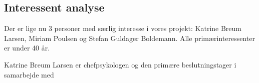 \subsection{Interessent analyse}

Der er lige nu 3 personer med særlig interesse i vores projekt: Katrine Breum Larsen, Miriam Poulsen og Stefan Guldager Boldemann.
Alle primærinteressenter er under 40 år.

Katrine Breum Larsen er chefpsykologen og den primære beslutningstager i samarbejde med 